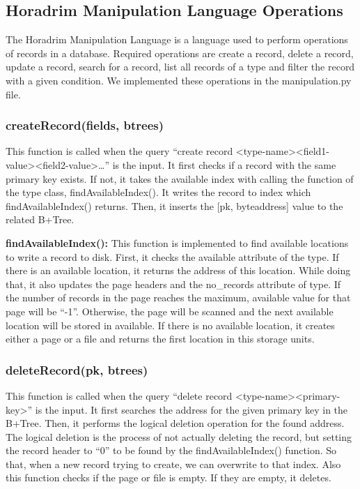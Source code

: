 \documentclass{article}
\begin{document}
\subsection{Horadrim Manipulation Language Operations}
\label{DML}
The Horadrim Manipulation Language is a language used to perform operations of records in a database. Required operations are create a record, delete a record, update a record, search for a record, list all records of a type and filter the record with a given condition. We implemented these operations in the manipulation.py file.

\subsubsection{createRecord(fields, btrees)}
This function is called when the query “create record \textless type-name\textgreater \textless field1-value\textgreater \textless field2-value\textgreater…” is the input. It first checks if a record with the same primary key exists. If not, it takes the available index with calling the function of the type class, findAvailableIndex(). It writes the record to index which findAvailableIndex() returns. Then, it inserts the [pk, byteaddress] value to the related B+Tree.

\textbf{findAvailableIndex():} This function is implemented to find available locations to write a record to disk. First, it checks the available attribute of the type. If there is an available location, it returns the address of this location. While doing that, it also updates the page headers and the no\_records attribute of type. If the number of records in the page reaches the maximum, available value for that page will be “-1”. Otherwise, the page will be  scanned and the next available location will be stored in available. If there is no available location, it creates either a page or a file and returns the first location in this storage units. 

\subsubsection{deleteRecord(pk, btrees)}
This function is called when the query “delete record \textless type-name\textgreater \textless primary-key\textgreater” is the input. It first searches the address for the given primary key in the B+Tree. Then, it performs the logical deletion operation for the found address. The logical deletion is the process of not actually deleting the record, but setting the record header to “0” to be found by the findAvailableIndex() function. So that, when a new record trying to create, we can overwrite to that index. Also this function checks if the page or file is empty. If they are empty, it deletes.
\end{document}
